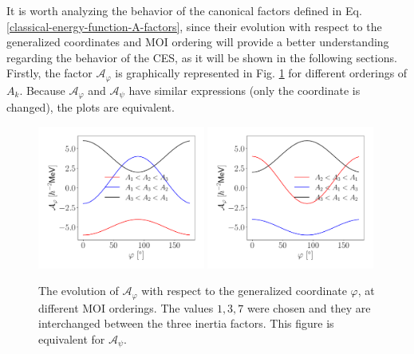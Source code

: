 It is worth analyzing the behavior of the canonical factors defined in Eq. \ref{classical-energy-function-A-factors}, since their evolution with respect to the generalized coordinates and MOI ordering will provide a better understanding regarding the behavior of the CES, as it will be shown in the following sections. Firstly, the factor $\mathcal{A}_\varphi$ is graphically represented in Fig. \ref{fig-A-varphi-canonical} for different orderings of $A_k$. Because $\mathcal{A}_\varphi$ and $\mathcal{A}_\psi$ have similar expressions (only the coordinate is changed), the plots are equivalent.
\begin{figure}
    \centering
    \includegraphics[width=0.49\textwidth]{Chapters/Figures/A_varphi_1.pdf}
    \includegraphics[width=0.49\textwidth]{Chapters/Figures/A_varphi_2.pdf}
    \caption{The evolution of $\mathcal{A}_\varphi$ with respect to the generalized coordinate $\varphi$, at different MOI orderings. The values $1,3,7$ were chosen and they are interchanged between the three inertia factors. This figure is equivalent for $\mathcal{A}_\psi$.}
    \label{fig-A-varphi-canonical}
\end{figure}

